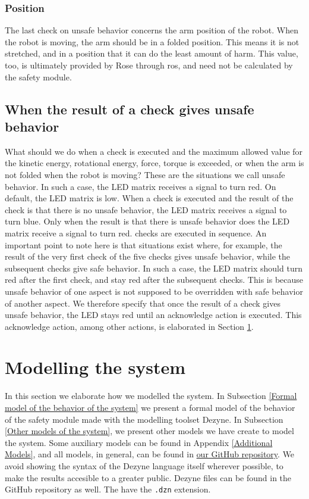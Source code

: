 \documentclass[12pt]{scrreprt}
\begin{document}
\subsubsection{Position}
The last check on unsafe behavior concerns the arm position of the robot. When the robot is moving, the arm should be in a folded position. This means it is not stretched, and in a position that it can do the least amount of harm. This value, too, is ultimately provided by Rose through \acrshort{ros}, and need not be calculated by the safety module.

\subsection{When the result of a check gives unsafe behavior}
\label{When the result of a check gives unsafe behavior}
What should we do when a check is executed and the maximum allowed value for the kinetic energy, rotational energy, force, torque is exceeded, or when the arm is not folded when the robot is moving? 
These are the situations we call unsafe behavior. In such a case, the LED matrix receives a signal to turn red. On default, the LED matrix is low. When a check is executed and the result of the check is that there is no unsafe behavior, the LED matrix receives a signal to turn blue. Only when the result is that there is unsafe behavior does the LED matrix receive a signal to turn red. checks are executed in sequence. An important point to note here is that situations exist where, for example, the result of the very first check of the five checks gives unsafe behavior, while the subsequent checks give safe behavior. In such a case, the LED matrix should turn red after the first check, and stay red after the subsequent checks. This is because unsafe behavior of one aspect is not supposed to be overridden with safe behavior of another aspect. We therefore specify that once the result of a check gives unsafe behavior, the LED stays red until an acknowledge action is executed. This acknowledge action, among other actions, is elaborated in Section \ref{}.

\newpage
\section{Modelling the system}
In this section we elaborate how we modelled the system. In Subsection \ref{Formal model of the behavior of the system} we present a formal model of the behavior of the safety module made with the modelling toolset Dezyne. In Subsection \ref{Other models of the system}, we present other models we have create to model the system. Some auxiliary models can be found in Appendix \ref{Additional Models}, and all models, in general, can be found in \href{https://github.com/Yousousen/safety-module-for-care-robot-rose.git}{our GitHub repository}. We avoid showing the syntax of the Dezyne language itself wherever possible, to make the results accesible to a greater public. Dezyne files can be found in the GitHub repository as well. The have the \texttt{.dzn} extension.
\end{document}
